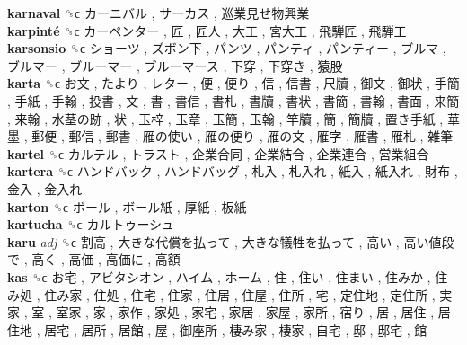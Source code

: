 \textbf{karnaval} ␝ϲ   カーニバル ,  サーカス ,  巡業見せ物興業   \\
\textbf{karpinté} ␝ϲ   カーペンター ,  匠 ,  匠人 ,  大工 ,  宮大工 ,  飛騨匠 ,  飛騨工   \\
\textbf{karsonsio} ␝ϲ   ショーツ ,  ズボン下 ,  パンツ ,  パンティ ,  パンティー ,  ブルマ ,  ブルマー ,  ブルーマー ,  ブルーマース ,  下穿 ,  下穿き ,  猿股   \\
\textbf{karta} ␝ϲ   お文 ,  たより ,  レター ,  便 ,  便り ,  信 ,  信書 ,  尺牘 ,  御文 ,  御状 ,  手簡 ,  手紙 ,  手翰 ,  投書 ,  文 ,  書 ,  書信 ,  書札 ,  書牘 ,  書状 ,  書簡 ,  書翰 ,  書面 ,  来簡 ,  来翰 ,  水茎の跡 ,  状 ,  玉梓 ,  玉章 ,  玉簡 ,  玉翰 ,  竿牘 ,  簡 ,  簡牘 ,  置き手紙 ,  華墨 ,  郵便 ,  郵信 ,  郵書 ,  雁の使い ,  雁の便り ,  雁の文 ,  雁字 ,  雁書 ,  雁札 ,  雑筆   \\
\textbf{kartel} ␝ϲ   カルテル ,  トラスト ,  企業合同 ,  企業結合 ,  企業連合 ,  営業組合   \\
\textbf{kartera} ␝ϲ   ハンドバック ,  ハンドバッグ ,  札入 ,  札入れ ,  紙入 ,  紙入れ ,  財布 ,  金入 ,  金入れ   \\
\textbf{karton} ␝ϲ   ボール ,  ボール紙 ,  厚紙 ,  板紙   \\
\textbf{kartucha} ␝ϲ   カルトゥーシュ   \\
\textbf{karu} \emph{adj}  ␝ϲ   割高 ,  大きな代償を払って ,  大きな犠牲を払って ,  高い ,  高い値段で ,  高く ,  高価 ,  高価に ,  高額   \\
\textbf{kas} ␝ϲ   お宅 ,  アビタシオン ,  ハイム ,  ホーム ,  住 ,  住い ,  住まい ,  住みか ,  住み処 ,  住み家 ,  住処 ,  住宅 ,  住家 ,  住居 ,  住屋 ,  住所 ,  宅 ,  定住地 ,  定住所 ,  実家 ,  室 ,  室家 ,  家 ,  家作 ,  家処 ,  家宅 ,  家居 ,  家屋 ,  家所 ,  宿り ,  居 ,  居住 ,  居住地 ,  居宅 ,  居所 ,  居館 ,  屋 ,  御座所 ,  棲み家 ,  棲家 ,  自宅 ,  邸 ,  邸宅 ,  館   \\

